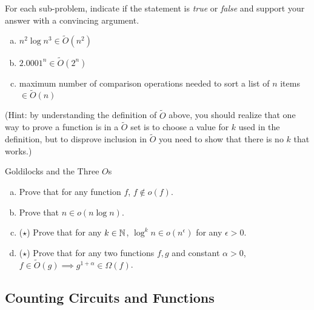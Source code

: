 \documentclass[11pt]{article}
\begin{document}
\begin{problem}
\rm For each sub-problem, indicate if the statement is \emph{true} or \emph{false} and support your answer with a convincing argument. \end{problem}

\begin{enumerate}[(a)]
    \item $n^2\log n^3 \in \widetilde{O}(n^2)$
    \item $2.0001^n \in \widetilde{O}(2^n)$
    \item maximum number of comparison operations needed to sort a list of $n$ items $\in \widetilde{O}(n)$
\end{enumerate}

(Hint: by understanding the definition of $\widetilde{O}$ above, you should realize that one way to prove a function is in a $\widetilde{O}$ set is to choose a value for $k$ used in the definition, but to disprove inclusion in $\widetilde{O}$ you need to show that there is no $k$ that works.)


\begin{problem}
Goldilocks and the Three $O$s
\end{problem}

\begin{enumerate}[(a)]
    \item Prove that for any function $f$, $f \notin o(f)$.
    \item Prove that $n \in o(n \log n)$.
    \item ($\star$) Prove that for any $k \in \mathbb{N}$, $\log^k n \in o(n^\epsilon)$ for any $\epsilon > 0$.
    \item ($\star$) Prove that for any two functions $f, g$ and constant $\alpha>0$, $f \in \widetilde{O}(g) \implies g^{1+\alpha} \in \Omega(f)$.
\end{enumerate}

\subsection*{Counting Circuits and Functions}
\end{document}
